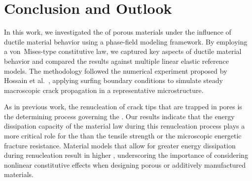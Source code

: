 \documentclass[pdflatex,sn-mathphys-num]{sn-jnl}%
\theoremstyle{thmstyleone}%
\theoremstyle{thmstyletwo}%
\theoremstyle{thmstylethree}%
\begin{document}


\section{Conclusion and Outlook}

In this work, we investigated the  of porous materials under the
influence of ductile material behavior using a phase-field modeling framework. By employing a
von~Mises-type constitutive law, we captured key aspects of ductile material behavior and
compared the results against multiple linear elastic reference models. The methodology followed
the numerical experiment proposed by Hossain et al.~\cite{hossain_effective_2014}, applying
surfing boundary conditions to simulate steady macroscopic crack propagation in a representative
microstructure.

As in previous work, the renucleation of crack tips that are trapped in pores is the determining
process governing the  . Our results indicate that the
energy dissipation capacity of the material law during this renucleation process plays a more
critical role for the  than the tensile strength or the microscopic
energetic fracture resistance. Material models that allow for greater energy dissipation during
renucleation result in higher , underscoring the importance of considering
nonlinear constitutive effects when designing porous or additively manufactured materials.
\end{document}
